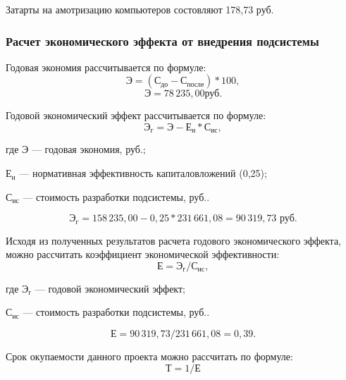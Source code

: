 			Затарты на амотризацию компьютеров состовляют 178,73 руб.

		\newpage
		\subsubsection{Расчет экономического эффекта от внедрения подсистемы}
			Годовая экономия рассчитывается по формуле:
			\begin{equation}\label{eq:annual_performance}
				\text{Э} = (\text{С}_{\text{до}} - \text{С}_{\text{после}}) * 100,
			\end{equation}
			$$ \text{Э} = 78\,235,00 \text{руб.}$$

			Годовой экономический эффект рассчитывается по формуле:
			\begin{equation}\label{eq:annual_economic_effect}
				\text{Э}_{\text{г}} = \text{Э} - \text{Е}_{\text{н}} * \text{С}_{\text{ис}},				
			\end{equation}
			\begin{ESKDexplanation}
				\item[где ] Э --- годовая экономия, руб.;
				\item $\text{Е}_{\text{н}}$ --- нормативная эффективность капиталовложений (0,25);
				\item $\text{С}_{\text{ис}}$ --- стоимость разработки подсистемы, руб..
			\end{ESKDexplanation}
			$$\text{Э}_{\text{г}} = 158\,235,00 - 0,25 * 231\,661,08 = 90\,319,73 \text{ руб.}$$

			Исходя из полученных результатов расчета годового экономического эффекта, можно рассчитать коэффициент экономической эффективности:
			\begin{equation}\label{eq:cost_effectiveness_ratio}
				\text{Е} = \text{Э}_{\text{г}} / \text{С}_{\text{ис}},				
			\end{equation}
			\begin{ESKDexplanation}
				\item[где ]$\text{Э}_{\text{г}}$ --- годовой экономический эффект;					
				\item $\text{С}_{\text{ис}}$ --- стоимость разработки подсистемы, руб..
			\end{ESKDexplanation}
			$$\text{Е} = 90\,319,73 / 231\,661,08 = 0,39.$$

			Срок окупаемости данного проекта можно рассчитать по формуле:
			\begin{equation}\label{eq:payback_period}
				\text{Т} = 1 / \text{Е}				
			\end{equation}

